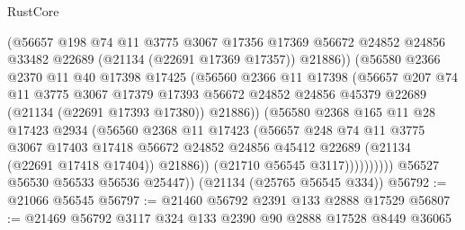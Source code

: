 \begin{lexlean}{RustCore}
\begin{coremodule}
                        (@56657
                          @198
                          @74
                          @11
                          @3775
                          @3067
                          @17356
                          @17369
                          @56672
                          @24852
                          @24856
                          @33482
                          @22689
                          (@21134 (@22691 @17369 @17357))
                          @21886))
                      (@56580
                        @2366
                        @2370
                        @11
                        @40
                        @17398
                        @17425
                        (@56560
                          @2366
                          @11
                          @17398
                          (@56657
                            @207
                            @74
                            @11
                            @3775
                            @3067
                            @17379
                            @17393
                            @56672
                            @24852
                            @24856
                            @45379
                            @22689
                            (@21134 (@22691 @17393 @17380))
                            @21886))
                        (@56580
                          @2368
                          @165
                          @11
                          @28
                          @17423
                          @2934
                          (@56560
                            @2368
                            @11
                            @17423
                            (@56657
                              @248
                              @74
                              @11
                              @3775
                              @3067
                              @17403
                              @17418
                              @56672
                              @24852
                              @24856
                              @45412
                              @22689
                              (@21134 (@22691 @17418 @17404))
                              @21886))
                          (@21710 @56545 @3117))))))))))
        @56527
        @56530
        @56533
        @56536
        @25447))
    (@21134 (@25765 @56545 @334))
@56792 := @21066 @56545
@56797 := @21460 @56792 @2391 @133 @2888 @17529
@56807 := @21469 @56792 @3117 @324 @133 @2390 @90 @2888 @17528 @8449 @36065

\end{coremodule}
\end{lexlean}
